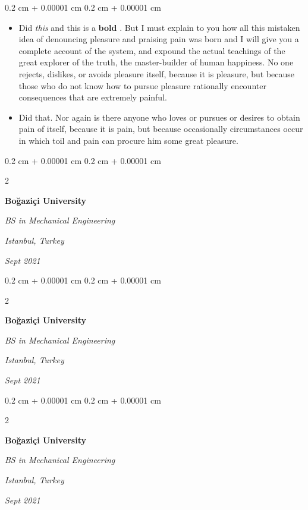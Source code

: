 \documentclass[10pt, letterpaper]{article}
\newenvironment{highlights}{
    \begin{itemize}[
        topsep=0.10 cm,
        parsep=0.10 cm,
        partopsep=0pt,
        itemsep=0pt,
        leftmargin=0.4 cm + 10pt
    ]
}{
    \end{itemize}
} %
\newenvironment{onecolentry}{
    \begin{adjustwidth}{
        0.2 cm + 0.00001 cm
    }{
        0.2 cm + 0.00001 cm
    }
}{
    \end{adjustwidth}
} %
\newenvironment{twocolentry}[2][]{
    \onecolentry
    \def\secondColumn{#2}
    \setcolumnwidth{\fill, 4.5 cm}
    \begin{paracol}{2}
}{
    \switchcolumn \raggedleft \secondColumn
    \end{paracol}
    \endonecolentry
} %
\let\hrefWithoutArrow\href
\renewcommand{\href}[2]{\hrefWithoutArrow{#1}{\ifthenelse{\equal{#2}{}}{ }{#2 }\raisebox{.15ex}{\footnotesize \faExternalLink*}}}
\begin{document}
        \vspace{0.10 cm}
        \begin{onecolentry}
            \begin{highlights}
                \item Did \textit{this} and this is a \textbf{bold} \href{https://example.com}{link}. But I must explain to you how all this mistaken idea of denouncing pleasure and praising pain was born and I will give you a complete account of the system, and expound the actual teachings of the great explorer of the truth, the master-builder of human happiness. No one rejects, dislikes, or avoids pleasure itself, because it is pleasure, but because those who do not know how to pursue pleasure rationally encounter consequences that are extremely painful.
                \item Did that. Nor again is there anyone who loves or pursues or desires to obtain pain of itself, because it is pain, but because occasionally circumstances occur in which toil and pain can procure him some great pleasure.
            \end{highlights}
        \end{onecolentry}


        \vspace{0.2 cm}

        \begin{twocolentry}{
        \textit{Istanbul, Turkey}    
            
        \textit{Sept 2021}}
            \textbf{Boğaziçi University}

            \textit{BS in Mechanical Engineering}
        \end{twocolentry}



        \vspace{0.2 cm}

        \begin{twocolentry}{
        \textit{Istanbul, Turkey}    
            
        \textit{Sept 2021}}
            \textbf{Boğaziçi University}

            \textit{BS in Mechanical Engineering}
        \end{twocolentry}



        \vspace{0.2 cm}

        \begin{twocolentry}{
        \textit{Istanbul, Turkey}    
            
        \textit{Sept 2021}}
            \textbf{Boğaziçi University}

            \textit{BS in Mechanical Engineering}
        \end{twocolentry}
\end{document}
